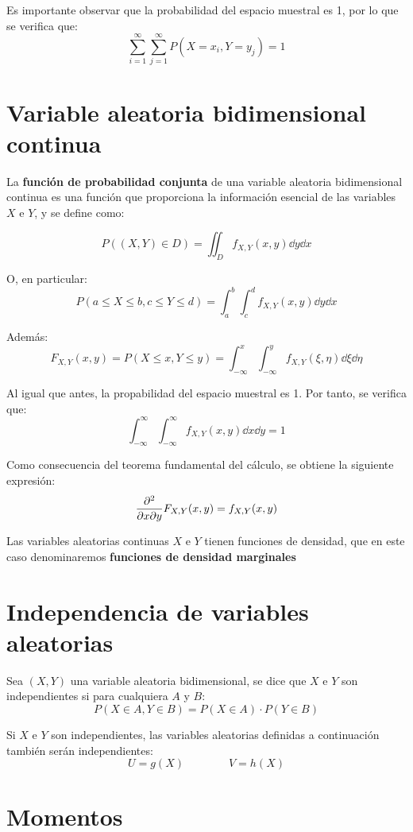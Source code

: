 \documentclass[a4paper]{book}
\begin{document}
Es importante observar que la probabilidad del espacio muestral es 1, por lo que se verifica que:
\[ \sum_{i=1}^{\infty}\sum_{j=1}^{\infty} P\left( X=x_i, Y=y_j \right) = 1 \]

\section{Variable aleatoria bidimensional continua}

La \textbf{función de probabilidad conjunta} de una variable aleatoria bidimensional continua es una función que proporciona la información esencial de las variables $X$ e $Y$, y se define como:

\[ P\left( \left( X,Y \right) \in D\right) = \iint_{D}f_{X,Y}(x,y)\dd{y} \dd{x}\]

O, en particular:
\[P\left( a\leq X \leq b, c\leq Y \leq d\right) = \int_{a}^{b}\int_{c}^{d} f_{X,Y}(x,y)\dd{y} \dd{x}\]

Además:
\[\boxed{F_{X,Y}(x,y) = P \left( X\leq x, Y\leq y\right)} = \int_{-\infty}^{x}\int_{-\infty}^{y} f_{X,Y}(\xi , \eta ) \dd{\xi} \dd{\eta}\]

Al igual que antes, la propabilidad del espacio muestral es 1. Por tanto, se verifica que:
\[\int_{-\infty}^{\infty}\int_{-\infty}^{\infty} f_{X,Y}(x,y) \dd{x} \dd{y} = 1\]

Como consecuencia del teorema fundamental del cálculo, se obtiene la siguiente expresión:
\[\pdv[2]{}{x}{y} F_{X,Y}(x,y) = f_{X,Y}(x,y)\]

Las variables aleatorias continuas $X$ e $Y$ tienen funciones de densidad, que en este caso denominaremos \textbf{funciones de densidad marginales}

\section{Independencia de variables aleatorias}
Sea $\left( X,Y\right)$ una variable aleatoria bidimensional, se dice que $X$ e $Y$ son independientes si para cualquiera $A$ y $B$:
\[P\left( X\in A, Y\in B\right) = P\left(X\in A\right)\cdot P\left(Y\in B\right)\]

Si $X$ e $Y$ son independientes, las variables aleatorias definidas a continuación también serán independientes:
\[U=g(X) \qquad \qquad V=h(X)\]

\section{Momentos}
\end{document}
